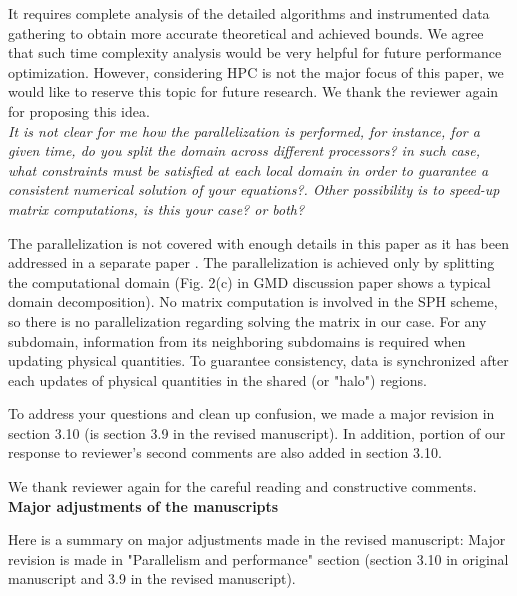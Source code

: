 \documentclass{article}
\begin{document}
It requires complete analysis of the detailed algorithms and instrumented data gathering to obtain  more accurate theoretical and achieved bounds. We agree that such  time complexity analysis would be very helpful for future performance optimization. However, considering HPC is not the major focus of this paper, we would like to reserve this topic for future research. We thank the reviewer again for proposing this idea.\\[3pt]

\textit{It is not clear for me how the parallelization is performed, for instance, for a given time, do you split the domain across different processors? in such case, what constraints must be satisfied at each local domain in order to guarantee a consistent numerical solution of your equations?. Other possibility is to speed-up matrix computations, is this your case? or both?}

The parallelization is not covered with enough details in this paper as it has been addressed in a separate paper \cite {cao2017data}.  The parallelization is achieved only by splitting the computational domain (Fig. 2(c) in GMD discussion paper shows a typical domain decomposition). No matrix computation is involved in the SPH scheme, so there is no parallelization regarding solving the matrix in our case.
For any subdomain, information from its neighboring subdomains is required when updating physical quantities.   To guarantee consistency, data is synchronized after each updates of physical quantities in the shared (or "halo") regions.

To address your questions and clean up confusion, {\color{blue}we made a major revision in section 3.10 (is section 3.9 in the revised manuscript). In addition, portion of our response to reviewer's second comments are also added in section 3.10.}
 
We thank reviewer again for the careful reading and constructive comments.\\[12pt]

\textbf{\large Major adjustments of the manuscripts}

{\color{blue}Here is a summary on major adjustments made in the revised manuscript: 
Major revision is made in "Parallelism and performance" section (section 3.10 in original manuscript and 3.9 in the revised manuscript).}
 
\end{document}
